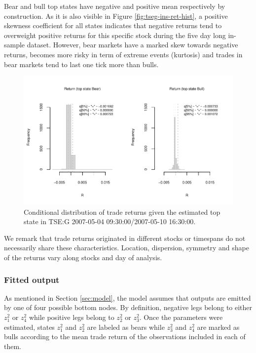 \documentclass[]{article}
\begin{document}
\normalsize

Bear and bull top states have negative and positive mean respectively by
construction. As it is also visible in Figure
\ref{fig:tseg-ins-ret-hist}, a positive skewness coefficient for all
states indicates that negative returns tend to overweight positive
returns for this specific stock during the five day long in-sample
dataset. However, bear markets have a marked skew towards negative
returns, becomes more risky in term of extreme events (kurtosis) and
trades in bear markets tend to last one tick more than bulls.

\begin{figure}[H]
\includegraphics[width=\textwidth]{main_files/figure-latex/unnamed-chunk-15-1} \caption{Conditional distribution of trade returns given the estimated top state in TSE:G 2007-05-04 09:30:00/2007-05-10 16:30:00. \label{fig:tseg-ins-ret-hist}}\label{fig:unnamed-chunk-15}
\end{figure}

We remark that trade returns originated in different stocks or timespans
do not necessarily share these characteristics. Location, dispersion,
symmetry and shape of the returns vary along stocks and day of analysis.

\subsubsection{Fitted output}\label{fitted-output}

As mentioned in Section \ref{sec:model}, the model assumes that outputs
are emitted by one of four possible bottom nodes. By definition,
negative legs belong to either \(z_{1}^2\) or \(z_{4}^2\) while positive
legs belong to \(z_{2}^2\) or \(z_{3}^2\). Once the parameters were
estimated, states \(z_{1}^2\) and \(z_{2}^2\) are labeled as bears while
\(z_{3}^2\) and \(z_{4}^2\) are marked as bulls according to the mean
trade return of the observations included in each of them.
\end{document}
